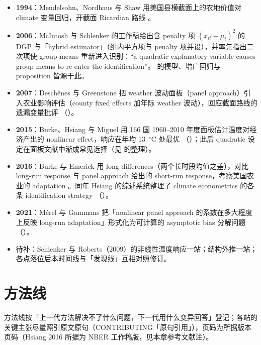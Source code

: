 \begin{itemize}
  \item \textbf{1994}：Mendelsohn、Nordhaus 与 Shaw 用美国县横截面上的农地价值对 climate 变量回归，开截面 Ricardian 路线 \citep{mendelsohn1994impact}。
  \item \textbf{2006}：McIntosh 与 Schlenker 的工作稿给出含 penalty 项 $(x_{it}-\mu_i)^2$ 的 DGP 与「hybrid estimator」（组内平方项与 penalty 项并设），并率先指出二次项使 group means 重新进入识别：``a quadratic explanatory variable causes group means to re-enter the identification''\citep[摘要页；模型见第~4 页、hybrid estimator 见第~6--7 页]{mcintosh2006identifying}。 的模型、增广回归与 proposition 皆源于此。
  \item \textbf{2007}：Deschênes 与 Greenstone 把 weather 波动面板（panel approach）引入农业影响评估（county fixed effects 加年际 weather 波动），回应截面路线的遗漏变量批评 \citep{deschenes2007economic}（）。
  \item \textbf{2015}：Burke、Hsiang 与 Miguel 用 166 国 1960--2010 年度面板估计温度对经济产出的 nonlinear effect，响应在年均 13~$^\circ$C 处最优 \citep{burke2015global}（）；此后 quadratic 设定在面板文献中渐成常见选择（见 \citealp[第~1214 页脚注~15]{merel2021climate} 的整理）。
  \item \textbf{2016}：Burke 与 Emerick 用 long differences（两个长时段均值之差），对比 long-run response 与 panel approach 给出的 short-run response，考察美国农业的 adaptation \citep{burke2016adaptation}。同年 Hsiang 的综述系统整理了 climate econometrics 的各条 identification strategy \citep{hsiang2016climate}（）。
  \item \textbf{2021}：Mérel 与 Gammans 把「nonlinear panel approach 的系数在多大程度上反映 long-run adaptation」形式化为可计算的 asymptotic bias 分解问题（）。
  \item 待补：Schlenker 与 Roberts（2009）的非线性温度响应一站；结构外推一站；各点落位后本时间线与「发现线」互相对照修订。
\end{itemize}

\section{方法线}

方法线按「上一代方法解决不了什么问题，下一代用什么变异回答」登记；各站的关键主张尽量照引原文原句（CONTRIBUTING「原句引用」），页码为所据版本页码（Hsiang 2016 所据为 NBER 工作稿版，见本章参考文献注）。

